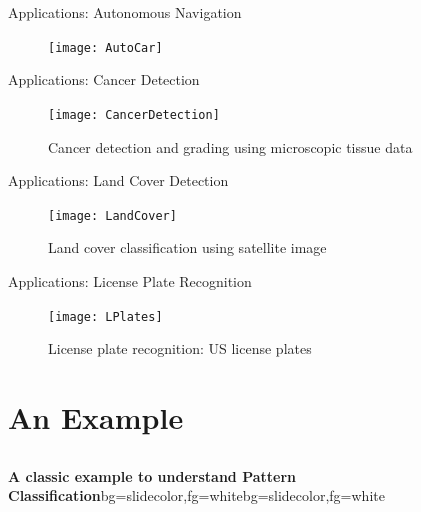\begin{frame}{Applications: Autonomous Navigation}
\begin{figure}
\texttt{[image: AutoCar]}
\end{figure}
\end{frame}

\begin{frame}{Applications: Cancer Detection}
\begin{figure}
\texttt{[image: CancerDetection]}
\caption{Cancer detection and grading using microscopic tissue data}
\end{figure}
\end{frame}

\begin{frame}{Applications: Land Cover Detection}
\begin{figure}
\texttt{[image: LandCover]}
\caption{Land cover classification using satellite image}
\end{figure}
\end{frame}

\begin{frame}{Applications: License Plate Recognition}
\begin{figure}
\texttt{[image: LPlates]}
\caption{License plate recognition: US license plates}
\end{figure}
\end{frame}

\section{An Example}
\subsection{}

\begin{frame}{}
\begin{variableblock}{\centering \Large \textbf{\vspace{4pt}\newline A classic example to understand Pattern Classification\vspace{4pt}}}{bg=slidecolor,fg=white}{bg=slidecolor,fg=white}
\end{variableblock}
\end{frame}

